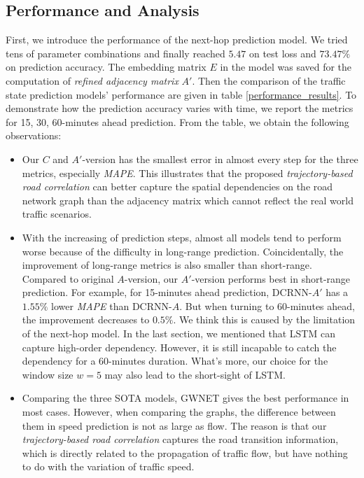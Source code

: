 \subsection{Performance and Analysis}
First, we introduce the performance of the next-hop prediction model. We tried tens of parameter combinations and finally reached $5.47$ on test loss and $73.47\%$ on prediction accuracy. The embedding matrix $E$ in the model was saved for the computation of \textit{refined adjacency matrix} $A'$. Then the comparison of the traffic state prediction models' performance are given in table \ref{performance_results}. To demonstrate how the prediction accuracy varies with time, we report the metrics for 15, 30, 60-minutes ahead prediction. From the table, we obtain the following observations:

\begin{itemize}
    \item Our $C$ and $A'$-version has the smallest error in almost every step for the three metrics, especially \textit{MAPE}. This illustrates that the proposed \textit{trajectory-based road correlation} can better capture the spatial dependencies on the road network graph than the adjacency matrix which cannot reflect the real world traffic scenarios.
    \item With the increasing of prediction steps, almost all models tend to perform worse because of the difficulty in long-range prediction. Coincidentally, the improvement of long-range metrics is also smaller than short-range. Compared to original $A$-version, our $A'$-version performs best in short-range prediction. For example, for 15-minutes ahead prediction, DCRNN-$A'$ has a $1.55\%$ lower \textit{MAPE} than DCRNN-$A$. But when turning to 60-minutes ahead, the improvement decreases to $0.5\%$. We think this is caused by the limitation of the next-hop model. In the last section, we mentioned that LSTM can capture high-order dependency. However, it is still incapable to catch the dependency for a 60-minutes duration. What's more, our choice for the window size $w=5$ may also lead to the short-sight of LSTM.
    \item Comparing the three SOTA models, GWNET gives the best performance in most cases. However, when comparing the graphs, the difference between them in speed prediction is not as large as flow. The reason is that our \textit{trajectory-based road correlation} captures the road transition information, which is directly related to the propagation of traffic flow, but have nothing to do with the variation of traffic speed.

\end{itemize}
